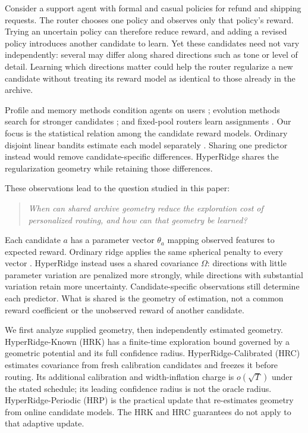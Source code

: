 \documentclass{article} %
\begin{document}
Consider a support agent with formal and casual policies for refund and
shipping requests. The router chooses one policy and observes only that
policy's reward. Trying an uncertain policy can therefore reduce reward, and
adding a revised policy introduces another candidate to learn. Yet these
candidates need not vary independently: several may differ along shared
directions such as tone or level of detail. Learning which directions matter
could help the router regularize a new candidate without treating its reward
model as identical to those already in the archive.

Profile and memory methods condition agents on users
\citep{salemi2023lamp,jin2026personalizing,zhang2025personaagent,westhausser2025persistent};
evolution methods search for stronger candidates
\citep{fernando2023promptbreeder,guo2024evoprompt,zhou2024symbolic,agrawal2025geparp};
and fixed-pool routers learn assignments
\citep{ong2024routellm,li2025llmbandit,tsai2026neuralucb}.
Our focus is the statistical relation among the candidate reward models.
Ordinary disjoint linear bandits estimate each model separately
\citep{li2010contextual,chu2011linucb}. Sharing one predictor instead would
remove candidate-specific differences. HyperRidge shares the regularization
geometry while retaining those differences.

These observations lead to the question studied in this paper:
\begin{quote}
\emph{When can shared archive geometry reduce the exploration cost of
personalized routing, and how can that geometry be learned?}
\end{quote}

Each candidate $a$ has a parameter vector $\theta_a$ mapping observed features
to expected reward. Ordinary ridge applies the same spherical penalty to
every vector \citep{abbasi2011oful,chu2011linucb}. HyperRidge instead uses a
shared covariance $\Omega$: directions with little parameter variation are
penalized more strongly, while directions with substantial variation retain
more uncertainty. Candidate-specific observations still determine each
predictor. What is shared is the geometry of estimation, not a common reward
coefficient or the unobserved reward of another candidate.

We first analyze supplied geometry, then independently estimated geometry.
HyperRidge-Known (HRK) has a finite-time exploration bound governed by a
geometric potential and its full confidence radius.
HyperRidge-Calibrated (HRC) estimates covariance from fresh calibration
candidates and freezes it before routing. Its additional calibration and
width-inflation charge is $o(\sqrt T)$ under the stated schedule; its leading
confidence radius is not the oracle radius.
HyperRidge-Periodic (HRP) is the practical update that re-estimates geometry
from online candidate models. The HRK and HRC guarantees do not apply to
that adaptive update.
\end{document}
